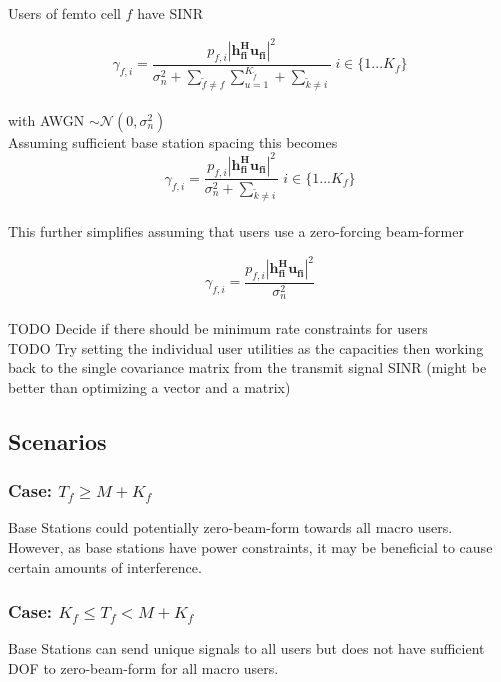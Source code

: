 \documentclass[12pt]{article}
\begin{document}
Users of femto cell $f$ have SINR 


\begin{equation}
\gamma_{f,i} = \frac{p_{f,i}|\mathbf{h^H_{fi}u_{fi}}|^2}
{\sigma^2_{n}  + \sum_{\tilde{f}\neq f} \sum_{u=1}^{K_{\tilde{f}}} + \sum_{\tilde{k}\neq i}} \; i \in \{1 ... K_f\}
\end{equation}
\\
with AWGN $\sim \mathcal{N}(0,\sigma^2_n)$
\\

Assuming sufficient base station spacing this becomes 
\begin{equation}
\gamma_{f,i} = \frac{p_{f,i}|\mathbf{h^H_{fi}u_{fi}}|^2}{\sigma^2_{n}  +  \sum_{\tilde{k}\neq i}} \; i \in \{1 ... K_f\}
\end{equation}
\\

This further simplifies assuming that users use a zero-forcing beam-former

\begin{equation}
\gamma_{f,i} = \frac{p_{f,i}|\mathbf{h^H_{fi}u_{fi}}|^2}{\sigma^2_{n} }
\end{equation}
\\

TODO Decide if there should be minimum rate constraints for users
\\

TODO Try setting the individual user utilities as the capacities then working back to the single covariance matrix from the transmit signal SINR (might be better than optimizing a vector and a matrix)

\subsection{Scenarios}

\subsubsection{Case: $T_f \geq M + K_f$}
Base Stations could potentially zero-beam-form towards all macro users. However, as base stations have power constraints, it may be beneficial to cause certain amounts of interference. 

\subsubsection{Case: $K_f \leq T_f < M + K_f$}
Base Stations can send unique signals to all users but does not have sufficient DOF to zero-beam-form for all macro users.
\end{document}
